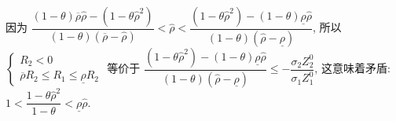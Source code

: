 \documentclass[10.0pt]{article}
\begin{document}
因为 $ \dfrac{(1 - \theta) \overline{\rho} {\hat \rho} - (1 - \theta {\hat \rho}^2)}{(1 - \theta) (\overline{\rho} - {\hat \rho})} < {\hat \rho} < \dfrac{(1 - \theta {\hat \rho}^2) - (1 - \theta) \underline{\rho} {\hat \rho}}{(1 - \theta) ({\hat \rho} - \underline{\rho})} $, 所以 $ \left\{ \begin{matrix} R_2 < 0 \\ \overline{\rho} R_2 \leqslant R_1 \leqslant \underline{\rho} R_2 \end{matrix} \right. $ 等价于 $ \dfrac{(1 - \theta {\hat \rho}^2) - (1 - \theta) \underline{\rho} {\hat \rho}}{(1 - \theta) ({\hat \rho} - \underline{\rho})} \leqslant - \dfrac{\sigma_2 Z_2^0}{\sigma_1 Z_1^0} $, 这意味着矛盾: $ 1 < \dfrac{1 - \theta {\hat \rho}^2}{1 - \theta} < \underline{\rho} {\hat \rho} $.
\end{document}
